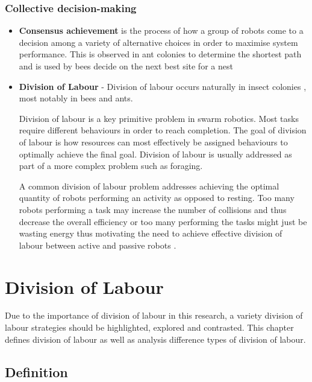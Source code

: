 \subsubsection{Collective decision-making}
\begin{itemize}
	\item \textbf{Consensus achievement} is the process of how a group of robots come to a decision among a variety of alternative choices in order to maximise system performance. This is observed in ant colonies to determine the shortest path \cite{bonabeau2001self} and is used by bees decide on the next best site for a nest \cite{seeley2001nest}
	
	\item \textbf{Division of Labour} - Division of labour occurs naturally in insect colonies \cite{gautrais2002emergent}, most notably in bees and ants.

Division of labour is a key primitive problem in swarm robotics. Most tasks require different behaviours in order to reach completion. The goal of division of labour is how resources can most effectively be assigned behaviours to optimally achieve the final goal. Division of labour is usually addressed as part of a more complex problem such as foraging.
 
A common division of labour problem addresses achieving the optimal quantity of robots performing an activity as opposed to resting. Too many robots performing a task may increase the number of collisions and thus decrease the overall efficiency or too many performing the tasks might just be wasting energy thus motivating the need to achieve effective division of labour between active and passive robots \cite{jones2003adaptive, krieger2000call}.

\end{itemize}

\section{Division of Labour}

\label{chap:divisionoflabour}
Due to the importance of division of labour in this research, a variety division of labour strategies should be highlighted, explored and contrasted. This chapter defines division of labour as well as analysis difference types of division of labour.

\subsection{Definition}
\label{sec:second:definition}

